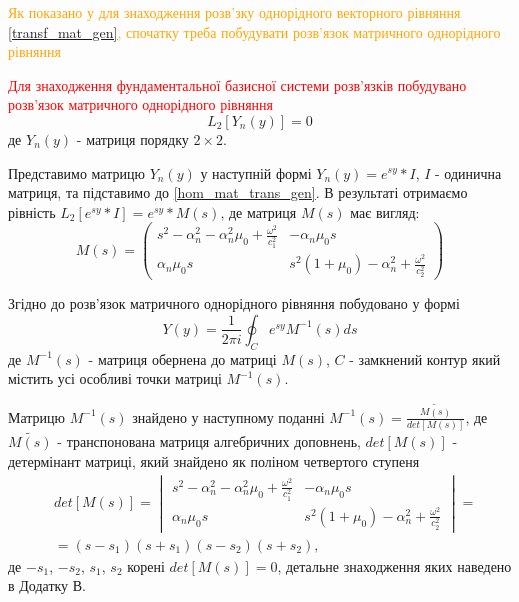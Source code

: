 \textcolor{orange}
{
Як показано у \cite{popov_4} для знаходження розв'зку однорідного векторного рівняння \eqref{transf_mat_gen},
спочатку треба побудувати розв'язок матричного однорідного рівняння
}

\textcolor{red}
{
Для знаходження фундаментальної базисної системи розв'язків побудувано розв'язок матричного однорідного рівняння
}
\begin{equation}\label{hom_mat_trans_gen}
    L_2\left[ Y_n(y) \right] = 0
\end{equation}
де $Y_n(y)$ - матриця порядку $2\times2$.

Представимо матрицю $Y_n(y)$ у наступній формі $Y_n(y) = e^{sy}*I$, $I$ - одинична матриця, та підставимо до \eqref{hom_mat_trans_gen}.
В результаті отримаємо рівність $L_2\left[ e^{sy}*I \right] = e^{sy} * M(s)$, де матриця $M(s)$ має вигляд:
\begin{equation}
    M(s) = \begin{pmatrix}
        s^2 - \alpha_n^2 - \alpha_n^2\mu_0 + \frac{\omega^2}{c_1^2} & -\alpha_n \mu_0 s \\
        \alpha_n \mu_0 s & s^2 (1 + \mu_0) -\alpha_n^2 + \frac{\omega^2}{c_2^2}
     \end{pmatrix}
\end{equation}

Згідно до \cite{gantmaher} розв'язок матричного однорідного рівняння побудовано у формі
\begin{equation}
    Y(y) = \frac{1}{2\pi i} \oint_C e^{sy} M^{-1}(s)ds
\end{equation}
де $M^{-1}(s)$ - матриця обернена до матриці $M(s)$, $C$ - замкнений контур який містить усі особливі точки матриці $M^{-1}(s)$.

Матрицю $M^{-1}(s)$ знайдено у наступному поданні $M^{-1}(s) = \frac{\widetilde{M(s)}}{det[M(s)]}$, де $\widetilde{M(s)}$ - транспонована матриця алгебричних доповнень,
$det[M(s)]$ - детермінант матриці, який знайдено як поліном четвертого ступеня
\begin{align}
    &det[M(s)] = \begin{vmatrix}
        s^2 - \alpha_n^2 - \alpha_n^2\mu_0 + \frac{\omega^2}{c_1^2} & -\alpha_n \mu_0 s \\
        \alpha_n \mu_0 s & s^2 (1 + \mu_0) -\alpha_n^2 + \frac{\omega^2}{c_2^2}
     \end{vmatrix} = \nonumber \\
    &=(s - s_1)(s + s_1)(s - s_2)(s + s_2),
\end{align}
де $-s_1$, $-s_2$, $s_1$, $s_2$ корені $det[M(s)]=0$, детальне знаходження яких наведено в Додатку В.

